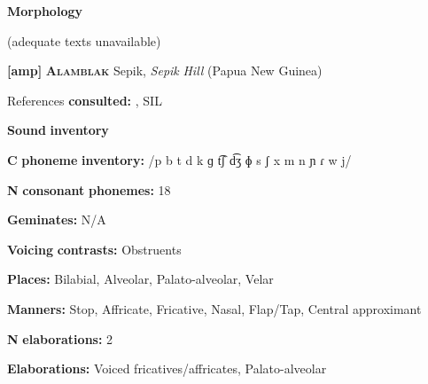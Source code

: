 \documentclass[output=paper]{langsci/langscibook}
\begin{document}
\begin{styleBody}
\textbf{Morphology}
\end{styleBody}

\begin{styleBody}
(adequate texts unavailable)
\end{styleBody}

\begin{styleBody}
\textbf{[amp]}   \textbf{\textsc{Alamblak}}  Sepik, \textit{Sepik} \textit{Hill} (Papua New Guinea)
\end{styleBody}

\begin{styleBody}
References \textbf{consulted:} \citet{Bruce1984}, SIL 
\end{styleBody}

\begin{styleBody}
\textbf{Sound} \textbf{inventory}
\end{styleBody}

\begin{styleBody}
\textbf{C} \textbf{phoneme} \textbf{inventory:} /p b t d k ɡ t͡ʃ d͡ʒ ɸ s ʃ x m n ɲ ɾ w j/
\end{styleBody}

\begin{styleBody}
\textbf{N} \textbf{consonant} \textbf{phonemes:} 18
\end{styleBody}

\begin{styleBody}
\textbf{Geminates:} N/A
\end{styleBody}

\begin{styleBody}
\textbf{Voicing} \textbf{contrasts:} Obstruents
\end{styleBody}

\begin{styleBody}
\textbf{Places:} Bilabial, Alveolar, Palato-alveolar, Velar
\end{styleBody}

\begin{styleBody}
\textbf{Manners:} Stop, Affricate, Fricative, Nasal, Flap/Tap, Central approximant
\end{styleBody}

\begin{styleBody}
\textbf{N} \textbf{elaborations:} 2
\end{styleBody}

\begin{styleBody}
\textbf{Elaborations:} Voiced fricatives/affricates, Palato-alveolar
\end{styleBody}
\end{document}
